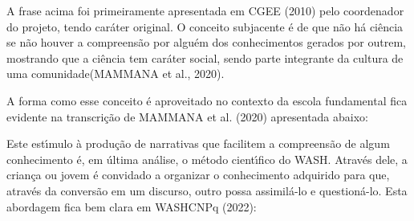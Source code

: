 \documentclass[
12pt,		%
openright,	%
twoside,  %
a4paper,			%
chapter=TITLE,		%
english,			%
french,				%
spanish,			%
brazil				%
]{USPSC-classe/USPSC}
\begin{document}
\noindent\begin{center}\mbox{\centering{}}\end{center}


A frase acima foi primeiramente apresentada em  CGEE (2010) pelo coordenador do projeto, tendo car\'ater original. O conceito subjacente \'e de que \textquotedbl n\~ao h\'a ci\^encia se n\~ao houver a compreens\~ao por algu\'em dos conhecimentos gerados por outrem, mostrando que a ci\^encia tem car\'ater social, sendo parte integrante da cultura de uma comunidade\textquotedbl   (MAMMANA et al., 2020).









A forma como esse conceito \'e aproveitado no contexto da escola fundamental fica evidente na transcri\c{c}\~ao de MAMMANA et al. (2020) apresentada abaixo:










\noindent\begin{center}\mbox{\centering{}}\end{center}


Este est\'{\i}mulo \`a produ\c{c}\~ao de narrativas que facilitem a compreens\~ao de algum conhecimento \'e, em \'ultima an\'alise, o m\'etodo cient\'{\i}fico do WASH. Atrav\'es dele, a crian\c{c}a ou jovem \'e convidado a organizar o conhecimento adquirido para que, atrav\'es da convers\~ao em um discurso, outro possa assimil\'a-lo e question\'a-lo. Esta abordagem fica bem clara em  WASHCNPq (2022):
\end{document}
